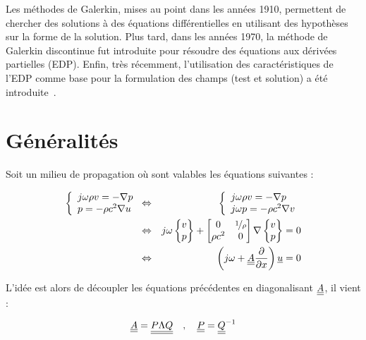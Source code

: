 Les méthodes de Galerkin, mises au point dans les années 1910, permettent de chercher des solutions à des équations
différentielles en utilisant des hypothèses sur la forme de la solution. Plus tard, dans les années 1970, la méthode de
Galerkin discontinue fut introduite pour résoudre des équations aux dérivées partielles (EDP). Enfin, très récemment,
l'utilisation des caractéristiques de l'EDP comme base pour la formulation des champs (test et solution) a été
introduite~\cite{Gabard11}.

\section{Généralités}

Soit un milieu de propagation où sont valables les équations suivantes :

\begin{eqnarray}
    \left\{\begin{array}{l}
        j\omega\rho v = -\nabla p\\
        p = -\rho c^2 \nabla u
    \end{array}\right.
    & \Leftrightarrow &
    \left\{\begin{array}{l}
        j\omega\rho v = -\nabla p\\
        j\omega p = -\rho c^2 \nabla v
    \end{array}\right.
    \notag\\ & \Leftrightarrow &
    j\omega \begin{Bmatrix}v\\p\end{Bmatrix} + 
    \begin{bmatrix}
        0 & \nicefrac{1}{\rho}\\
        \rho c^2 & 0
    \end{bmatrix}
    \nabla \begin{Bmatrix}v\\p\end{Bmatrix} = 0
    \notag\\ & \Leftrightarrow &
        \left(j\omega + \underline{\underline{A}}\frac{\partial}{\partial x}\right) \underline{u} = 0 \label{dgm:eq_u}
\end{eqnarray}

L'idée est alors de découpler les équations précédentes en diagonalisant $\underline{\underline{A}}$, il vient :

\begin{equation*}
    \underline{\underline{A}} = \underline{\underline{P\Lambda Q}} \quad,\quad \underline{\underline{P}} = \underline{\underline{Q}}^{-1}
\end{equation*}

